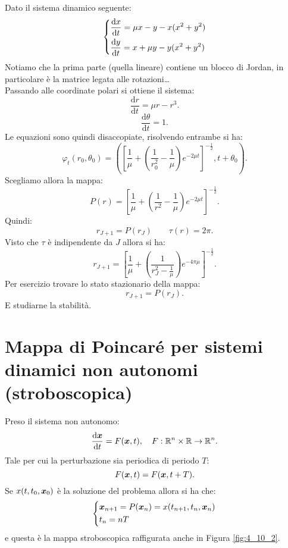 \begin{exmp}[]
    Dato il sistema dinamico seguente:
    \[
    \begin{dcases}
	\frac{\text{d} x}{\text{d} t} = \mu x-y-x(x^2+y^2) \\
	\frac{\text{d} y}{\text{d} t} = x + \mu y - y(x^2+y^2) 
    \end{dcases}
    \]
    Notiamo che la prima parte (quella lineare) contiene un blocco di Jordan, in particolare è la matrice legata alle rotazioni\ldots\\
    Passando alle coordinate polari si ottiene il sistema:
    \[
        \frac{\text{d} r}{\text{d} t} = \mu r-r^3
    .\] 
    \[
        \frac{\text{d} \theta}{\text{d} t} = 1
    .\] 
    Le equazioni sono quindi disaccopiate, risolvendo entrambe si ha:
    \[
	\varphi_t(r_0,\theta_0) = \left(\left[\frac{1}{\mu} + \left(\frac{1}{r_0^2}-\frac{1}{\mu}\right)e^{-2\mu t}\right]^{-\frac{1}{2}}, t + \theta_0\right)
    .\] 
    Scegliamo allora la mappa:
    \[
	P(r) = \left[\frac{1}{\mu}+\left(\frac{1}{r^2}-\frac{1}{\mu}\right)e^{-2\mu t}\right]^{-\frac{1}{2}}
    .\] 
    Quindi:
    \[
	r_{J+1}= P(r_{J}) \qquad  \tau (r) = 2\pi
    .\] 
    Visto che $\tau$ è indipendente da $J$ allora si ha:
    \[
        r_{J+1}=\left[\frac{1}{\mu}+ \left(\frac{1}{r_J^2 - \frac{1}{\mu}}\right)e^{-4\pi\mu}\right]^{-\frac{1}{2}}
    .\] 
    Per esercizio trovare lo stato stazionario della mappa:
    \[
	r_{J+1}= P(r_J) 
    .\] E studiarne la stabilità.
\end{exmp}
\noindent
\section*{Mappa di Poincaré per sistemi dinamici non autonomi (stroboscopica)}%
Preso il sistema non autonomo:
\[
    \frac{\text{d} \boldsymbol{x}}{\text{d} t} = F(\boldsymbol{x}, t), \quad  F: \mathbb{R}^n\times \mathbb{R}\to \mathbb{R}^n
.\] 
Tale per cui la perturbazione sia periodica di periodo $T$:
\[
    F(\boldsymbol{x}, t) = F(\boldsymbol{x}, t + T) 
.\] 
Se $x(t, t_0, \boldsymbol{x}_0)$ è la soluzione del problema allora si ha che:
\[
\begin{dcases}
    \boldsymbol{x}_{n+1}= P(\boldsymbol{x}_n) = x(t_{n+1}, t_n, \boldsymbol{x}_n)\\
    t_n = nT
\end{dcases}
\]
e questa è la mappa stroboscopica raffigurata anche in Figura \ref{fig:4_10_2}.
